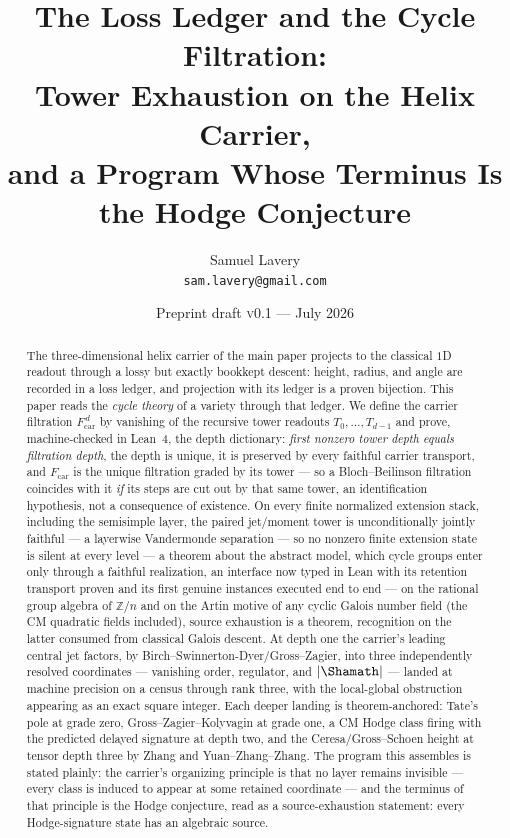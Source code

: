 \documentclass[11pt]{article}
\title{The Loss Ledger and the Cycle Filtration:\\
Tower Exhaustion on the Helix Carrier,\\
and a Program Whose Terminus Is the Hodge Conjecture}
\author{Samuel Lavery\\ \texttt{sam.lavery@gmail.com}}
\date{Preprint draft \textsc{v0.1} --- July 2026}
\theoremstyle{definition}
\theoremstyle{remark}
\newcommand{\Fcar}{F_{\mathrm{car}}}
\begin{document}
\maketitle

\begin{abstract}
The three-dimensional helix carrier of the main paper projects to the classical
$1$D readout through a lossy but exactly bookkept descent: height, radius, and
angle are recorded in a loss ledger, and projection with its ledger is a proven
bijection. This paper reads the \emph{cycle theory} of a variety through that
ledger. We define the carrier filtration $\Fcar^{\,d}$ by vanishing of the
recursive tower readouts $T_0,\dots,T_{d-1}$ and prove, machine-checked in
Lean~4, the depth dictionary: \emph{first nonzero tower depth equals filtration
depth}, the depth is unique, it is preserved by every faithful carrier
transport, and $\Fcar$ is the unique filtration graded by its tower --- so a
Bloch--Beilinson filtration coincides with it \emph{if} its steps are cut out
by that same tower, an identification hypothesis, not a consequence of
existence. On every finite normalized
extension stack, including the semisimple layer, the paired jet/moment tower is
unconditionally jointly faithful --- a layerwise Vandermonde separation --- so
no nonzero finite extension state is silent at every level --- a theorem
about the abstract model, which cycle groups enter only through a faithful
realization, an interface now typed in Lean with its retention transport
proven and its first genuine instances executed end to end --- on the rational
group algebra of $\mathbb Z/n$ and on the Artin motive of any cyclic Galois
number field (the CM quadratic fields included), source exhaustion is a
theorem, recognition on the latter consumed from classical Galois descent. At
depth one the carrier's leading
central jet factors, by Birch--Swinnerton-Dyer/Gross--Zagier, into three
independently resolved coordinates --- vanishing order, regulator, and
$|\Shamath|$ --- landed at machine precision on a census through rank three,
with the local-global obstruction appearing as an exact square integer. Each
deeper landing is theorem-anchored: Tate's pole at grade zero,
Gross--Zagier--Kolyvagin at grade one, a CM Hodge class firing with the
predicted delayed signature at depth two, and the Ceresa/Gross--Schoen height
at tensor depth three by Zhang and Yuan--Zhang--Zhang. The program this
assembles is stated plainly: the carrier's organizing principle is that no
layer remains invisible --- every class is induced to appear at some retained
coordinate --- and the terminus of that principle is the Hodge conjecture, read
as a source-exhaustion statement: every Hodge-signature state has an algebraic
source.


\end{abstract}
\end{document}
